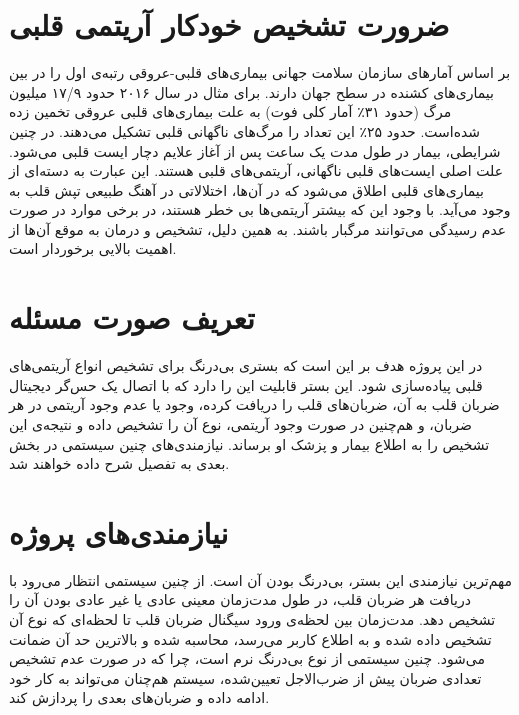 
\pagebreak

\section{ضرورت تشخیص خودکار آریتمی قلبی}
بر اساس آمارهای سازمان سلامت جهانی بیماری‌های قلبی-عروقی  رتبه‌ی اول را در بین بیماری‌های کشنده در سطح جهان دارند. برای مثال در سال ۲۰۱۶ حدود ۱۷/۹ میلیون مرگ (حدود ۳۱٪ آمار کلی فوت) به علت بیماری‌های قلبی عروقی تخمین زده شده‌است. \cite{WHO} حدود ۲۵٪ این تعداد را مرگ‌های ناگهانی قلبی  تشکیل می‌دهند. \cite{Srinivasan2018} در چنین شرایطی، بیمار در طول مدت یک ساعت پس از آغاز علایم دچار ایست قلبی می‌شود. 
علت اصلی ایست‌های قلبی ناگهانی، آریتمی‌های قلبی هستند. \cite{Cleveland} این عبارت به دسته‌ای از بیماری‌های قلبی اطلاق می‌شود که در آن‌ها، اختلالاتی در آهنگ طبیعی تپش قلب به وجود می‌آید. با وجود این که بیشتر آریتمی‌ها بی خطر هستند، در برخی موارد در صورت عدم رسیدگی می‌توانند مرگبار باشند. به همین دلیل، تشخیص و درمان به موقع آن‌ها از اهمیت بالایی برخوردار است.

\section{تعریف صورت مسئله} 
در این پروژه هدف بر این است که بستری بی‌درنگ برای تشخیص انواع آریتمی‌های قلبی پیاده‌سازی شود. این بستر قابلیت این را دارد که با اتصال یک حس‌گر دیجیتال ضربان قلب به آن، ضربان‌های قلب را دریافت کرده، وجود یا عدم وجود آریتمی در هر ضربان، و هم‌چنین در صورت وجود آریتمی، نوع آن را تشخیص داده و نتیجه‌ی این تشخیص را به اطلاع بیمار و پزشک او برساند. نیازمندی‌های چنین سیستمی در بخش بعدی به تفصیل شرح داده خواهند شد.

\section{نیازمندی‌های پروژه}
مهم‌ترین نیازمندی این بستر، بی‌درنگ بودن آن است. از چنین سیستمی انتظار می‌رود با دریافت هر ضربان قلب، در طول مدت‌زمان معینی عادی یا غیر عادی بودن آن را تشخیص دهد. مدت‌زمان بین لحظه‌ی ورود سیگنال ضربان قلب تا لحظه‌ای که نوع آن تشخیص داده شده و به اطلاع کاربر می‌رسد، محاسبه شده و بالاترین حد آن ضمانت می‌شود. چنین سیستمی از نوع بی‌درنگ نرم است، چرا که در صورت عدم تشخیص تعدادی ضربان پیش از ضرب‌الاجل تعیین‌شده، سیستم هم‌چنان می‌تواند به کار خود ادامه داده و ضربان‌های بعدی را پردازش کند.

